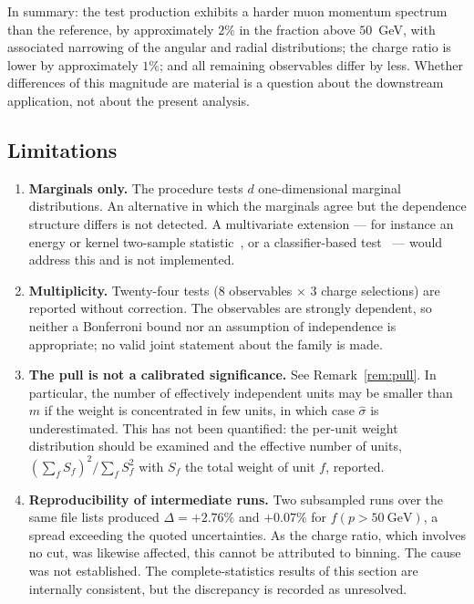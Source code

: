 \documentclass[11pt,a4paper]{article}
\theoremstyle{definition}
\theoremstyle{plain}
\theoremstyle{remark}
\begin{document}
In summary: the test production exhibits a harder muon momentum spectrum than
the reference, by approximately $2\%$ in the fraction above $50$~GeV, with
associated narrowing of the angular and radial distributions; the charge ratio
is lower by approximately $1\%$; and all remaining observables differ by less.
Whether differences of this magnitude are material is a question about the
downstream application, not about the present analysis.

\subsection{Limitations}

\begin{enumerate}
\item \textbf{Marginals only.} The procedure tests $d$ one-dimensional marginal
distributions. An alternative in which the marginals agree but the dependence
structure differs is not detected. A multivariate extension --- for instance an
energy or kernel two-sample statistic~\cite{Szekely2004,Gretton2012}, or a
classifier-based test~\cite{Friedman2003,Lopez2017} --- would address this and is
not implemented.

\item \textbf{Multiplicity.} Twenty-four tests ($8$ observables $\times$ $3$
charge selections) are reported without correction. The observables are strongly
dependent, so neither a Bonferroni bound nor an assumption of independence is
appropriate; no valid joint statement about the family is made.

\item \textbf{The pull is not a calibrated significance.} See
Remark~\ref{rem:pull}. In particular, the number of effectively independent
units may be smaller than $m$ if the weight is concentrated in few units, in
which case $\hat{\sigma}$ is underestimated. This has not been quantified: the
per-unit weight distribution should be examined and the effective number of
units, $\left(\sum_f S_f\right)^2 \big/ \sum_f S_f^2$ with $S_f$ the total
weight of unit $f$, reported.

\item \textbf{Reproducibility of intermediate runs.} Two subsampled runs over
the same file lists produced $\Delta = +2.76\%$ and $+0.07\%$ for
$f(p>50~\mathrm{GeV})$, a spread exceeding the quoted uncertainties. As the
charge ratio, which involves no cut, was likewise affected, this cannot be
attributed to binning. The cause was not established. The complete-statistics
results of this section are internally consistent, but the discrepancy is
recorded as unresolved.


\end{enumerate}
\end{document}
